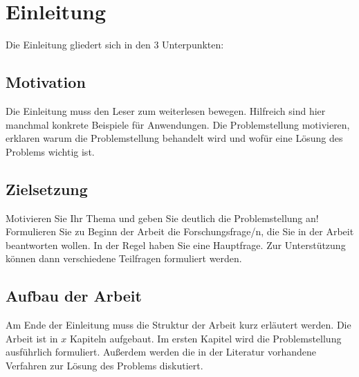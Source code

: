\documentclass[12pt]{article}
\begin{document}


\fancyhf{}				%
\renewcommand{\sectionmark}[1]		%
	{\markboth{\sc \thesection{} #1}{}}
\addtolength{\headheight}{2.0pt}


\newpage
{}
\section{Einleitung}
Die Einleitung gliedert sich in den 3 Unterpunkten:

  \subsection{Motivation} Die Einleitung muss den Leser zum weiterlesen bewegen. Hilfreich sind hier manchmal konkrete Beispiele für Anwendungen.
   Die Problemstellung motivieren, erklaren warum die Problemstellung behandelt wird und wofür eine Lösung des Problems wichtig ist.
  \subsection{Zielsetzung} Motivieren Sie Ihr Thema und geben Sie deutlich die Problemstellung an!
  Formulieren Sie zu Beginn der Arbeit die Forschungsfrage/n, die Sie in der Arbeit beantworten wollen. In der Regel haben Sie eine Hauptfrage. Zur Unterstützung können dann verschiedene Teilfragen formuliert werden.
  \subsection{Aufbau der Arbeit} Am Ende der Einleitung muss die Struktur der Arbeit kurz erläutert werden.
  Die Arbeit ist in $x$ Kapiteln aufgebaut. Im ersten Kapitel wird die Problemstellung ausführlich formuliert. Außerdem werden die in der Literatur vorhandene Verfahren zur Lösung des Problems diskutiert.
\end{document}
